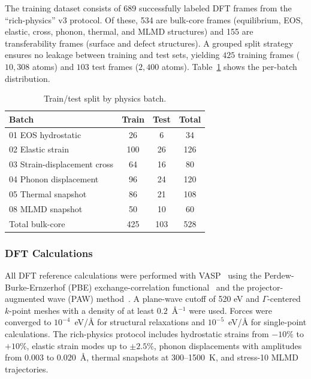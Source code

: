 \documentclass[twoside,prb,aps,floatfix,superscriptaddress,longbibliography]{revtex4-2}
\newcommand{\AAng}{\mbox{\AA}}
\begin{document}
The training dataset consists of 689 successfully labeled DFT frames from the ``rich-physics'' v3 protocol. Of these, 534 are bulk-core frames (equilibrium, EOS, elastic, cross, phonon, thermal, and MLMD structures) and 155 are transferability frames (surface and defect structures). A grouped split strategy ensures no leakage between training and test sets, yielding $425$ training frames ($10{,}308$ atoms) and $103$ test frames ($2{,}400$ atoms). Table~\ref{tab:split} shows the per-batch distribution.

\begin{table}[t]
\caption{Train/test split by physics batch.}
\label{tab:split}
\begin{ruledtabular}
\begin{tabular}{lccc}
\toprule
Batch & Train & Test & Total \\
\midrule
01 EOS hydrostatic & 26 & 6 & 34 \\
02 Elastic strain & 100 & 26 & 126 \\
03 Strain-displacement cross & 64 & 16 & 80 \\
04 Phonon displacement & 96 & 24 & 120 \\
05 Thermal snapshot & 86 & 21 & 108 \\
08 MLMD snapshot & 50 & 10 & 60 \\
\midrule
Total bulk-core & 425 & 103 & 528 \\
\bottomrule
\end{tabular}
\end{ruledtabular}
\end{table}

\subsubsection{DFT Calculations}

All DFT reference calculations were performed with VASP~\cite{Kresse1996VASP} using the Perdew-Burke-Ernzerhof (PBE) exchange-correlation functional~\cite{Perdew1996PBE} and the projector-augmented wave (PAW) method~\cite{Blochl1994PAW}. A plane-wave cutoff of 520 eV and $\Gamma$-centered $k$-point meshes with a density of at least $0.2$~\AA$^{-1}$ were used. Forces were converged to $10^{-4}$~eV/\AAng{} for structural relaxations and $10^{-5}$~eV/\AAng{} for single-point calculations. The rich-physics protocol includes hydrostatic strains from $-10\%$ to $+10\%$, elastic strain modes up to $\pm 2.5\%$, phonon displacements with amplitudes from $0.003$ to $0.020$~\AA, thermal snapshots at 300--1500~K, and stress-10 MLMD trajectories.
\end{document}
